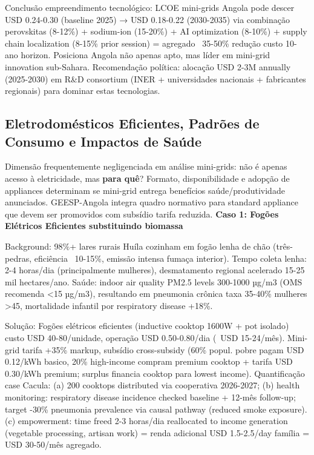 \documentclass[12pt, a4paper]{article}
\begin{document}
Conclusão empreendimento tecnológico: LCOE mini-grids Angola pode descer USD 0.24-0.30 (baseline 2025) → USD 0.18-0.22 (2030-2035) via combinação perovskitas (8-12\%) + sodium-ion (15-20\%) + AI optimization (8-10\%) + supply chain localization (8-15\% prior session) = agregado ~35-50\% redução custo 10-ano horizon. Posiciona Angola não apenas apto, mas líder em mini-grid innovation sub-Sahara. Recomendação política: alocação USD 2-3M annually (2025-2030) em R\&D consortium (INER + universidades nacionais + fabricantes regionais) para dominar estas tecnologias.

\subsection{Eletrodomésticos Eficientes, Padrões de Consumo e Impactos de Saúde}

Dimensão frequentemente negligenciada em análise mini-grids: não é apenas acesso à eletricidade, mas
\textbf{para quê}? Formato, disponibilidade e adopção de appliances determinam se mini-grid entrega benefícios saúde/produtividade anunciados. GEESP-Angola integra quadro normativo para standard appliance que devem ser promovidos com subsídio tarifa reduzida.
\textbf{Caso 1: Fogões Elétricos Eficientes substituindo biomassa}

Background: 98\%+ lares rurais Huíla cozinham em fogão lenha de chão (três-pedras, eficiência ~10-15\%, emissão intensa fumaça interior). Tempo coleta lenha: 2-4 horas/dia (principalmente mulheres), desmatamento regional acelerado 15-25 mil hectares/ano. Saúde: indoor air quality PM2.5 levels 300-1000 µg/m3 (OMS recomenda <15 µg/m3), resultando em pneumonia crônica taxa 35-40\% mulheres >45, mortalidade infantil por respiratory disease +18\%. 

Solução: Fogões elétricos eficientes (inductive cooktop 1600W + pot isolado) custo USD 40-80/unidade, operação USD 0.50-0.80/dia (~USD 15-24/mês). Mini-grid tarifa +35\% markup, subsídio cross-subsidy (60\% popul. pobre pagam USD 0.12/kWh basico, 20\% high-income compram premium cooktop + tarifa USD 0.30/kWh premium; surplus financia cooktop para lowest income). Quantificação case Cacula: (a) 200 cooktops distributed via cooperativa 2026-2027; (b) health monitoring: respiratory disease incidence checked baseline + 12-mês follow-up; target -30\% pneumonia prevalence via causal pathway (reduced smoke exposure). (c) empowerment: time freed 2-3 horas/dia reallocated to income generation (vegetable processing, artisan work) = renda adicional USD 1.5-2.5/day família = USD 30-50/mês agregado.
\end{document}
